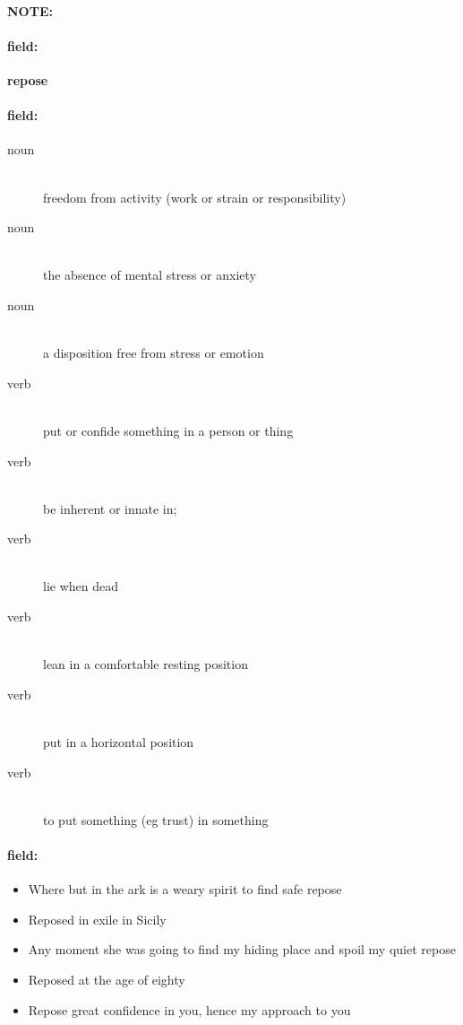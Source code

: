 \documentclass[12pt]{article}
\newenvironment{note}{\paragraph{NOTE:}}{}
\newenvironment{field}{\paragraph{field:}}{}
\begin{document}
\begin{note}
\begin{field}
\textbf{\large repose}
\end{field}


\begin{field}
\begin{description}
\item[noun] \hfill \\ 
freedom from activity (work or strain or responsibility)

\item[noun] \hfill \\ 
the absence of mental stress or anxiety

\item[noun] \hfill \\ 
a disposition free from stress or emotion

\item[verb] \hfill \\ 
put or confide something in a person or thing

\item[verb] \hfill \\ 
be inherent or innate in; 

\item[verb] \hfill \\ 
lie when dead

\item[verb] \hfill \\ 
lean in a comfortable resting position

\item[verb] \hfill \\ 
put in a horizontal position

\item[verb] \hfill \\ 
to put something (eg trust) in something

\end{description}
\end{field}

\begin{field}
\begin{itemize}
\item Where but in the ark is a weary spirit to find safe repose
\item Reposed in exile in Sicily
\item Any moment she was going to find my hiding place and spoil my quiet repose
\item Reposed at the age of eighty
\item Repose great confidence in you, hence my approach to you
\end{itemize}
\end{field}
\end{note}
\end{document}
